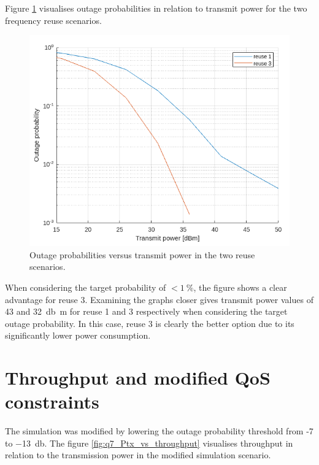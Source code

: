 \documentclass{article}
\begin{document}
Figure \ref{fig:q6_Ptx_vs_outage} visualises outage probabilities in relation to transmit power for the two frequency reuse scenarios.

\begin{figure}[!htb]
    \centering
    \includegraphics[width=12cm]{images/q6_Ptx_vs_outage.png}
    \caption{Outage probabilities versus transmit power in the two reuse scenarios.}
    \label{fig:q6_Ptx_vs_outage}
\end{figure}

When considering the target probability of \(< 1\ \%\), the figure shows a clear advantage for reuse 3. Examining the graphs closer gives transmit power values of 43 and \SI{32}{\decibel m} for reuse 1 and 3 respectively when considering the target outage probability. In this case, reuse 3 is clearly the better option due to its significantly lower power consumption.

\section{Throughput and modified QoS constraints}

The simulation was modified by lowering the outage probability threshold from -7 to \SI{-13}{\decibel}. The figure \ref{fig:q7_Ptx_vs_throughput} visualises throughput in relation to the transmission power in the modified simulation scenario.
\end{document}
